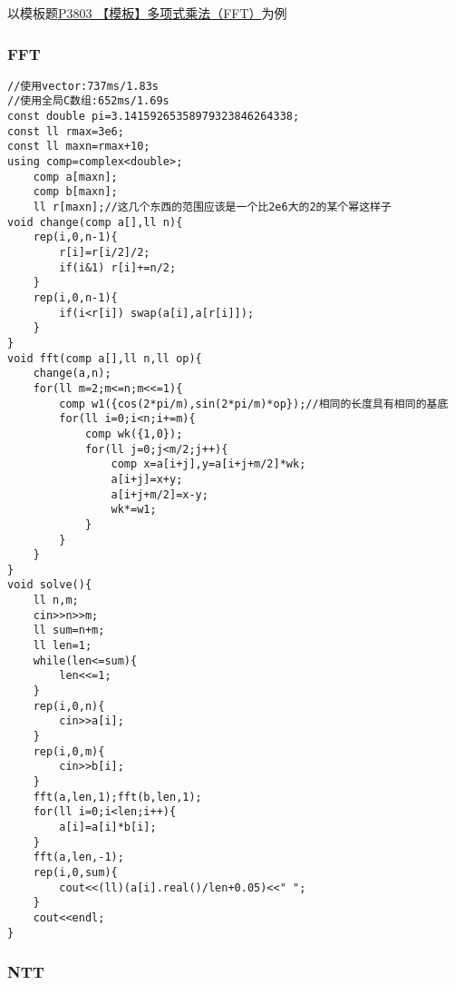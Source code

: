 \documentclass[]{article}
\begin{document}
以模板题\href{https://www.luogu.com.cn/problem/P3803}{P3803
【模板】多项式乘法（FFT）}为例

\hypertarget{fft}{%
\subsubsection{FFT}\label{fft}}

\begin{verbatim}
//使用vector:737ms/1.83s
//使用全局C数组:652ms/1.69s
const double pi=3.14159265358979323846264338;
const ll rmax=3e6;
const ll maxn=rmax+10;
using comp=complex<double>;
    comp a[maxn];
    comp b[maxn];
    ll r[maxn];//这几个东西的范围应该是一个比2e6大的2的某个幂这样子
void change(comp a[],ll n){
    rep(i,0,n-1){
        r[i]=r[i/2]/2;
        if(i&1) r[i]+=n/2;
    }
    rep(i,0,n-1){
        if(i<r[i]) swap(a[i],a[r[i]]);
    }
}
void fft(comp a[],ll n,ll op){
    change(a,n);
    for(ll m=2;m<=n;m<<=1){
        comp w1({cos(2*pi/m),sin(2*pi/m)*op});//相同的长度具有相同的基底
        for(ll i=0;i<n;i+=m){
            comp wk({1,0});
            for(ll j=0;j<m/2;j++){
                comp x=a[i+j],y=a[i+j+m/2]*wk;
                a[i+j]=x+y;
                a[i+j+m/2]=x-y;
                wk*=w1;
            }
        }
    }
}
void solve(){
    ll n,m;
    cin>>n>>m;
    ll sum=n+m;
    ll len=1;
    while(len<=sum){
        len<<=1;
    }
    rep(i,0,n){
        cin>>a[i];
    }
    rep(i,0,m){
        cin>>b[i];
    }
    fft(a,len,1);fft(b,len,1);
    for(ll i=0;i<len;i++){
        a[i]=a[i]*b[i];
    }
    fft(a,len,-1);
    rep(i,0,sum){
        cout<<(ll)(a[i].real()/len+0.05)<<" ";
    }
    cout<<endl;
}
\end{verbatim}

\hypertarget{ntt}{%
\subsubsection{NTT}\label{ntt}}
\end{document}
